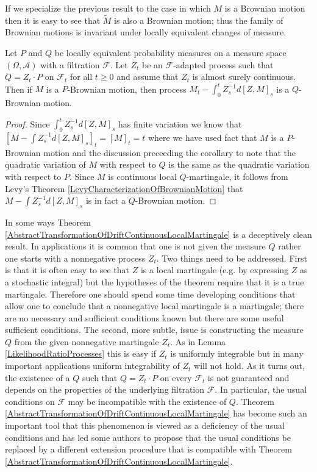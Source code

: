 If we specialize the previous result to the case in which $M$ is a Brownian motion then it is easy to see that $\tilde{M}$ is also a Brownian motion; thus the family of Brownian motions is invariant under locally equivalent changes of measure.
\begin{cor}Let $P$ and $Q$ be locally equivalent probability measures on a measure space $(\Omega, \mathcal{A})$ with a filtration $\mathcal{F}$.   Let $Z_t$ be an $\mathcal{F}$-adapted process such that $Q = Z_t \cdot P$ on $\mathcal{F}_t$ for all $t \geq 0$ and assume that $Z_t$ is almost surely continuous.  Then if $M$ is a $P$-Brownian motion, then process $M_t - \int_0^t Z^{-1}_s d[Z,M]_s$ is a $Q$-Brownian motion.
\end{cor}
\begin{proof}
Since $\int_0^t Z^{-1}_s d[Z,M]_s$ has finite variation we know that $[M - \int Z^{-1}_s d[Z,M]_s]_t = [M]_t = t$ where we have used fact that $M$ is a $P$-Brownian motion and the discussion preceeding the corollary to note that the quadratic variation of $M$ with respect to $Q$ is the same as the quadratic variation with respect to $P$.  Since $M$ is continuous local $Q$-martingale, it follows from Levy's Theorem \ref{LevyCharacterizationOfBrownianMotion} that $M - \int Z^{-1}_s d[Z,M]_s$ is in fact a $Q$-Brownian motion.
\end{proof}

In some ways Theorem \ref{AbstractTransformationOfDriftContinuousLocalMartingale} is a deceptively clean result.  In applications it is common that one is not given the measure $Q$ rather one starts with a nonnegative process $Z_t$.  Two things need to be addressed. First is that it is often easy to see that $Z$ is a local martingale (e.g. by expressing $Z$ as a stochastic integral) but the hypotheses of the theorem require that it is a true martingale.  Therefore one should spend some time developing conditions that allow one to conclude that a nonnegative local martingale is a martingale; there are no necessary and sufficient conditions known but there are some useful sufficient conditions.  The second, more subtle, issue is constructing the measure $Q$ from the given nonnegative martingale $Z_t$.  As in Lemma \ref{LikelihoodRatioProcesses} this is easy if $Z_t$ is uniformly integrable but in many important applications uniform integrability of $Z_t$ will not hold.  As it turns out, the existence of a $Q$ such that $Q=Z_t \cdot P$ on every $\mathcal{F}_t$ is not guaranteed and depends on the properties of the underlying filtration $\mathcal{F}$.  In particular, the usual conditions on $\mathcal{F}$ may be incompatible with the existence of $Q$.  Theorem \ref{AbstractTransformationOfDriftContinuousLocalMartingale} has become such an important tool that this phenomenon is viewed as a deficiency of the usual conditions and has led some authors to propose that the usual conditions be replaced by a different extension procedure that is compatible with Theorem \ref{AbstractTransformationOfDriftContinuousLocalMartingale}.


